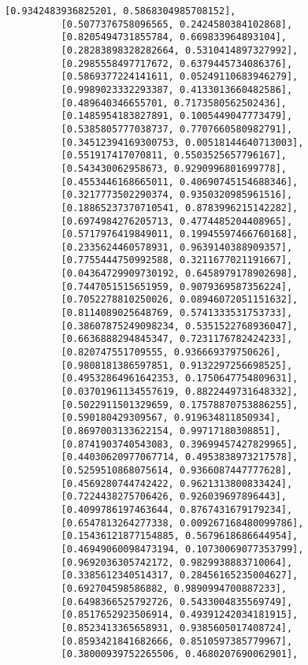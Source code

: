 \documentclass[11pt]{article}
\begin{document}
\begin{Verbatim}[commandchars=\\\{\}]
          [0.9342483936825201, 0.5868304985708152],
          [0.5077376758096565, 0.2424580384102868],
          [0.8205494731855784, 0.669833964893104],
          [0.28283898328282664, 0.5310414897327992],
          [0.2985558497717672, 0.6379445734086376],
          [0.5869377224141611, 0.05249110683946279],
          [0.9989023332293387, 0.4133013660482586],
          [0.489640346655701, 0.7173580562502436],
          [0.1485954183827891, 0.1005449047773479],
          [0.5385805777038737, 0.7707660580982791],
          [0.34512394169300753, 0.00518144640713003],
          [0.551917417070811, 0.5503525657796167],
          [0.543430062958673, 0.9290996801699778],
          [0.4553446168665011, 0.40690745154688346],
          [0.3217773502290374, 0.9350320985961516],
          [0.18865237370710541, 0.8783996215142282],
          [0.6974984276205713, 0.4774485204408965],
          [0.5717976419849011, 0.19945597466760168],
          [0.2335624460578931, 0.9639140388909357],
          [0.7755444750992588, 0.3211677021191667],
          [0.04364729909730192, 0.6458979178902698],
          [0.7447051515651959, 0.9079369587356224],
          [0.7052278810250026, 0.08946072051151632],
          [0.8114089025648769, 0.5741333531753733],
          [0.38607875249098234, 0.5351522768936047],
          [0.6636888294845347, 0.7231176782424233],
          [0.820747551709555, 0.936669379750626],
          [0.9808181386597851, 0.9132297256698525],
          [0.49532864961642353, 0.1750647754809631],
          [0.03701961134557619, 0.8822449731648332],
          [0.5022911501329659, 0.17578870753886255],
          [0.590180429309567, 0.919634811850934],
          [0.8697003133622154, 0.99717180308851],
          [0.8741903740543083, 0.39699457427829965],
          [0.44030620977067714, 0.4953838973217578],
          [0.5259510868075614, 0.9366087447777628],
          [0.4569280744742422, 0.9621313800833424],
          [0.7224438275706426, 0.926039697896443],
          [0.4099786197463644, 0.8767431679179234],
          [0.6547813264277338, 0.009267168480099786],
          [0.15436121877154885, 0.5679618686644954],
          [0.46949060098473194, 0.10730069077353799],
          [0.9692036305742172, 0.9829938883710064],
          [0.3385612340514317, 0.28456165235004627],
          [0.692704598586882, 0.9890994700887233],
          [0.6498366525792726, 0.5433004835569749],
          [0.8517652923506914, 0.49391242034181915],
          [0.8523413365658931, 0.9385605017408724],
          [0.8593421841682666, 0.8510597385779967],
          [0.38000939752265506, 0.4680207690062901],

\end{Verbatim}
\end{document}
